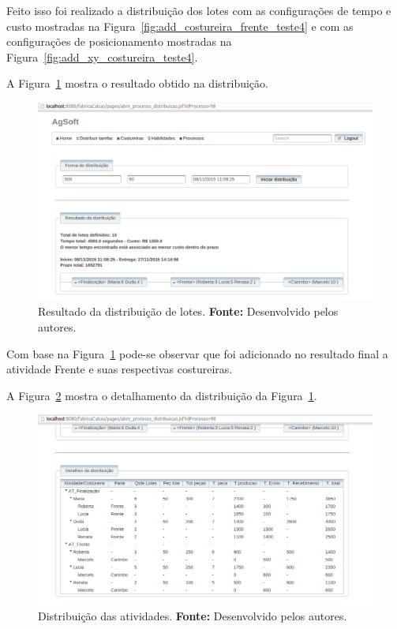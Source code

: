 \par Feito isso foi realizado a distribuição dos lotes com as configurações de
tempo e custo mostradas na Figura~\ref{fig:add_costureira_frente_teste4} e com
as configurações de posicionamento mostradas na Figura~\ref{fig:add_xy_costureira_teste4}.
\par A Figura~\ref{fig:resultado1_teste5} mostra o resultado obtido na
distribuição.



\begin{figure}[h!]
	\centerline{\includegraphics[scale=0.3]{./imagens/resultado1_teste5.png}}
	\caption[Resultado da distribuição de lotes.]
	{Resultado da distribuição de lotes. \textbf{Fonte:} Desenvolvido pelos
	autores.}
	\label{fig:resultado1_teste5}
\end{figure}

\par Com base na Figura~\ref{fig:resultado1_teste5} pode-se observar que foi
adicionado no resultado final a atividade Frente e suas respectivas costureiras.

\par A Figura~\ref{fig:detalhamento1_teste5} mostra o detalhamento da
distribuição da Figura~\ref{fig:resultado1_teste5}.

\newpage

\begin{figure}[h!]
	\centerline{\includegraphics[scale=0.3]{./imagens/detalhamento1_teste5.png}}
	\caption[Distribuição das atividades.]
	{Distribuição das atividades. \textbf{Fonte:} Desenvolvido pelos
	autores.}
	\label{fig:detalhamento1_teste5}
\end{figure}

